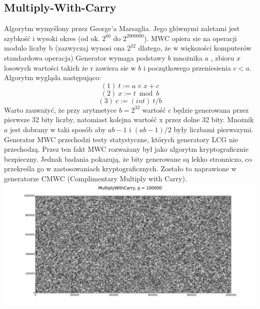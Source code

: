 \documentclass[a4paper, 11pt]{article} %
\begin{document}
\subsection{Multiply-With-Carry}
Algorytm wymyślony przez George'a Marsaglia. Jego głównymi zaletami jest szybkość i wysoki okres (od ok. $2^{60} $ do $2^{2000000}$).
MWC opiera sie na operacji modulo liczby b (zazwyczaj wynosi ona $2^{32}$ dlatego, że w większości komputerów standardowa operacja) 
Generator wymaga podstawy $b$ mnożnika $a$ , zbioru $x$ losowych wartości takich że r zawiera sie w $b$ i początkowego przeniesienia $c < a$. 
Algorytm wygląda następująco:
$$(1)\ t:=a \times x + c $$
$$(2)\ x:= t \bmod  b $$
$$(3)\ c:= (int)\ t/b$$
Warto zauważyć, że przy arytmetyce $b=2^{32}$ wartość $c$ będzie generowana przez pierwsze 32 bity liczby, natomiast kolejna wartość x przez dolne 32 bity. Mnożnik $a$ jest dobrany w taki sposób aby $ab-1$ i $(ab-1)/2$ były liczbami pierwszymi.
\newline Generator MWC przechodzi testy statystyczne, których generatory LCG nie przechodzą. Przez ten fakt MWC rozważany był jako algorytm kryptograficznie bezpieczny. Jednak badania pokazują, że bity generowane są lekko stronniczo, co przekreśla go w zastosowaniach kryptograficznych. Zostało to naprawione w generatorze CMWC (Complimentary Multiply with Carry).\\
\includegraphics[width=\linewidth]{img/mwc-1.png}





%

%

\end{document}
